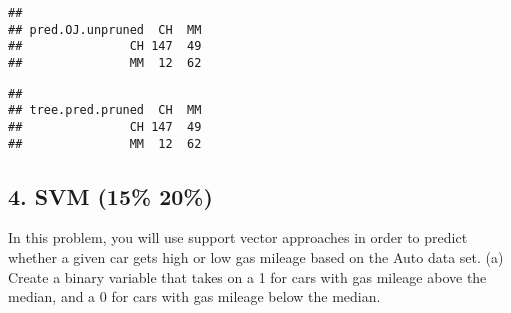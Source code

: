 \documentclass[]{article}
\newenvironment{Shaded}{\begin{snugshade}}{\end{snugshade}}
\newcommand{\KeywordTok}[1]{\textcolor[rgb]{0.13,0.29,0.53}{\textbf{#1}}}
\newcommand{\DecValTok}[1]{\textcolor[rgb]{0.00,0.00,0.81}{#1}}
\newcommand{\StringTok}[1]{\textcolor[rgb]{0.31,0.60,0.02}{#1}}
\newcommand{\CommentTok}[1]{\textcolor[rgb]{0.56,0.35,0.01}{\textit{#1}}}
\newcommand{\OperatorTok}[1]{\textcolor[rgb]{0.81,0.36,0.00}{\textbf{#1}}}
\newcommand{\NormalTok}[1]{#1}
\begin{document}
\begin{Shaded}
\end{Shaded}

\begin{verbatim}
##                 
## pred.OJ.unpruned  CH  MM
##               CH 147  49
##               MM  12  62
\end{verbatim}

\begin{Shaded}
\end{Shaded}

\begin{verbatim}
##                 
## tree.pred.pruned  CH  MM
##               CH 147  49
##               MM  12  62
\end{verbatim}

\subsection{4. SVM (15\% \textbar{} 20\%)}\label{svm-15-20}

In this problem, you will use support vector approaches in order to
predict whether a given car gets high or low gas mileage based on the
Auto data set. (a) Create a binary variable that takes on a 1 for cars
with gas mileage above the median, and a 0 for cars with gas mileage
below the median.

\begin{Shaded}
\end{Shaded}
\end{document}
